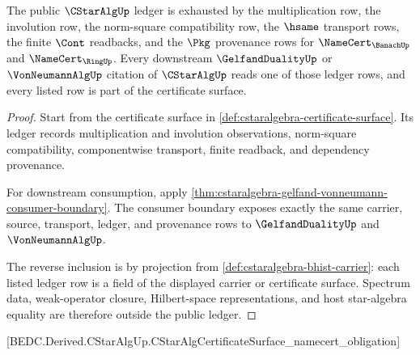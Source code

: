 \begin{theorem}
\label{thm:cstaralgebra-ledger-exactness}
The public $\CStarAlgUp$ ledger is exhausted by the multiplication row, the
involution row, the norm-square compatibility row, the $\hsame$ transport rows,
the finite $\Cont$ readbacks, and the $\Pkg$ provenance rows for
$\NameCert_{\BanachUp}$ and $\NameCert_{\RingUp}$. Every downstream
$\GelfandDualityUp$ or $\VonNeumannAlgUp$ citation of $\CStarAlgUp$ reads one of
those ledger rows, and every listed row is part of the certificate surface.
\end{theorem}
\begin{proof}
Start from the certificate surface in
\autoref{def:cstaralgebra-certificate-surface}. Its ledger records
multiplication and involution observations, norm-square compatibility,
componentwise transport, finite readback, and dependency provenance.

For downstream consumption, apply
\autoref{thm:cstaralgebra-gelfand-vonneumann-consumer-boundary}. The consumer
boundary exposes exactly the same carrier, source, transport, ledger, and
provenance rows to $\GelfandDualityUp$ and $\VonNeumannAlgUp$.

The reverse inclusion is by projection from
\autoref{def:cstaralgebra-bhist-carrier}: each listed ledger row is a field of
the displayed carrier or certificate surface. Spectrum data, weak-operator
closure, Hilbert-space representations, and host star-algebra equality are
therefore outside the public ledger.
\end{proof}

[BEDC.Derived.CStarAlgUp.CStarAlgCertificateSurface\_namecert\_obligation]

